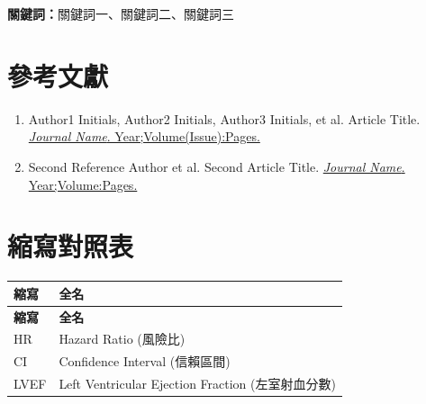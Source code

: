 \documentclass[12pt,a4paper]{article}
\begin{document}
\vspace{1cm}
\textbf{關鍵詞：}關鍵詞一、關鍵詞二、關鍵詞三

\section{參考文獻}

\begin{enumerate}
    \item Author1 Initials, Author2 Initials, Author3 Initials, et al. Article Title. \href{https://doi.org/10.xxxx/xxxxx}{\textit{Journal Name}. Year;Volume(Issue):Pages.}
    
    \item Second Reference Author et al. Second Article Title. \href{https://doi.org/10.xxxx/xxxxx}{\textit{Journal Name}. Year;Volume:Pages.}
\end{enumerate}

\section{縮寫對照表}

\begin{longtable}{p{4cm}p{10cm}}
\toprule
\textbf{縮寫} & \textbf{全名} \\
\midrule
\endfirsthead

\toprule
\textbf{縮寫} & \textbf{全名} \\
\midrule
\endhead

\bottomrule
\endfoot

HR & Hazard Ratio (風險比) \\
CI & Confidence Interval (信賴區間) \\
LVEF & Left Ventricular Ejection Fraction (左室射血分數) \\
\bottomrule
\end{longtable}
\end{document}

